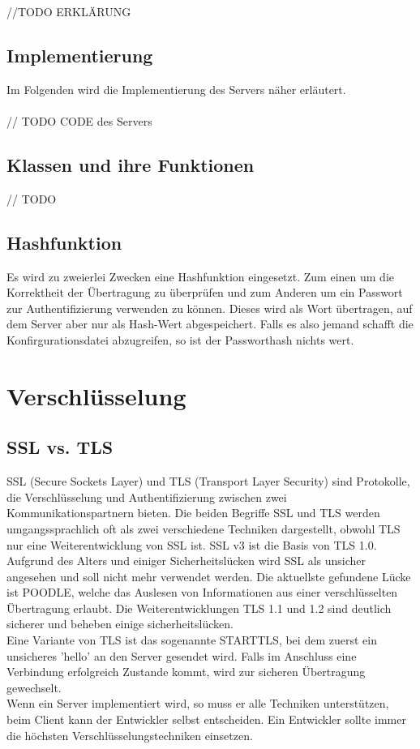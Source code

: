 //TODO ERKLÄRUNG

\subsection{Implementierung}
Im Folgenden wird die Implementierung des Servers näher erläutert. \\\\
	
	// TODO CODE des Servers

\subsection{Klassen und ihre Funktionen}
// TODO
\subsection{Hashfunktion}
Es wird zu zweierlei Zwecken eine Hashfunktion eingesetzt. Zum einen um die Korrektheit der Übertragung zu überprüfen und zum Anderen um ein Passwort zur Authentifizierung verwenden zu können. Dieses wird als Wort übertragen, auf dem Server aber nur als Hash-Wert abgespeichert. Falls es also jemand schafft die Konfirgurationsdatei abzugreifen, so ist der Passworthash nichts wert. 

\section{Verschlüsselung}
\subsection{SSL vs. TLS}
SSL (Secure Sockets Layer) und TLS (Transport Layer Security) sind Protokolle, die Verschlüsselung und Authentifizierung zwischen zwei Kommunikationspartnern bieten. Die beiden Begriffe SSL und TLS werden umgangssprachlich oft als zwei verschiedene Techniken dargestellt, obwohl TLS nur eine Weiterentwicklung von SSL ist. SSL v3 ist die Basis von TLS 1.0. \\
Aufgrund des Alters und einiger Sicherheitslücken wird SSL als unsicher angesehen und soll nicht mehr verwendet werden. Die aktuellste gefundene Lücke ist POODLE, welche das Auslesen von Informationen aus einer verschlüsselten Übertragung erlaubt. Die Weiterentwicklungen TLS 1.1 und 1.2 sind deutlich sicherer und beheben einige sicherheitslücken. \\
Eine Variante von TLS ist das sogenannte STARTTLS, bei dem zuerst ein unsicheres 'hello' an den Server gesendet wird. Falls im Anschluss eine Verbindung erfolgreich Zustande kommt, wird zur sicheren Übertragung gewechselt. \\
Wenn ein Server implementiert wird, so muss er alle Techniken unterstützen, beim Client kann der Entwickler selbst entscheiden. Ein Entwickler sollte immer die höchsten Verschlüsselungstechniken einsetzen. \\

